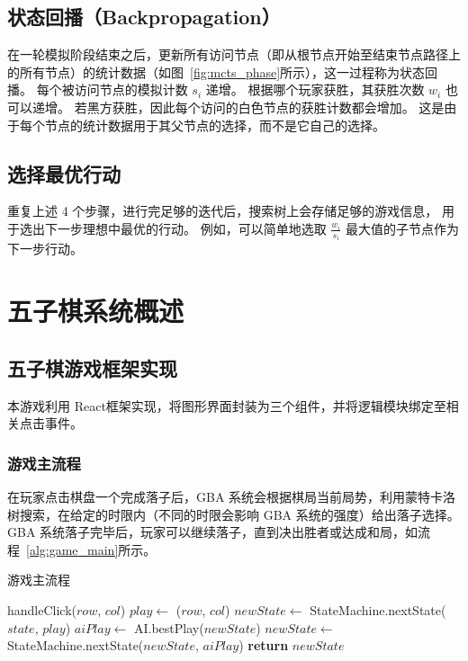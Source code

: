 \documentclass[UTF8,cs4size]{ctexart}
\begin{document}
\subsection{状态回播（Backpropagation）}
在一轮模拟阶段结束之后，更新所有访问节点（即从根节点开始至结束节点路径上的所有节点）的统计数据（如图~\ref{fig:mcts_phase}所示），这一过程称为状态回播。
每个被访问节点的模拟计数 $s_i$ 递增。
根据哪个玩家获胜，其获胜次数 $w_i$ 也可以递增。
若黑方获胜，因此每个访问的白色节点的获胜计数都会增加。
这是由于每个节点的统计数据用于其父节点的选择，而不是它自己的选择。

\subsection{选择最优行动}
重复上述 4 个步骤，进行完足够的迭代后，搜索树上会存储足够的游戏信息，
用于选出下一步理想中最优的行动。
例如，可以简单地选取 $\frac{w_i}{s_i}$ 最大值的子节点作为下一步行动。

\clearpage

\section{五子棋系统概述}
\subsection{五子棋游戏框架实现}
本游戏利用 React\cite{web:react}框架实现，将图形界面封装为三个组件，并将逻辑模块绑定至相关点击事件。
\subsubsection{游戏主流程}
在玩家点击棋盘一个完成落子后，GBA 系统会根据棋局当前局势，利用蒙特卡洛树搜索，在给定的时限内（不同的时限会影响 GBA 系统的强度）给出落子选择。
GBA 系统落子完毕后，玩家可以继续落子，直到决出胜者或达成和局，如流程~\ref{alg:game_main}所示。

\begin{algorithm}
	\algrenewcommand{}
	\algrenewcommand{}
	\caption{游戏主流程}
	\label{alg:game_main}
  \begin{algorithmic}[1]
      \State handleClick($row$, $col$)
      \State $play \gets$ ($row$, $col$)
      \State $newState \gets$ StateMachine.nextState($state$, $play$)
      \State $aiPlay \gets$ AI.bestPlay($newState$)
      \State $newState \gets$ StateMachine.nextState($newState$, $aiPlay$)
    \EndWhile
    \State \textbf{return} $newState$
	\end{algorithmic}  
\end{algorithm}
\end{document}
